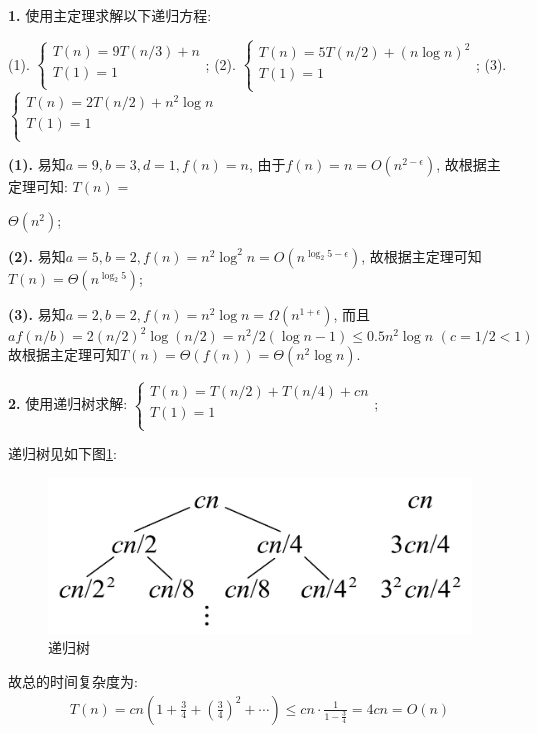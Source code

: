 \documentclass{article}
\begin{document}
\begin{homeworkProblem}
	\textbf{1.} 使用主定理求解以下递归方程:

	(1). $\begin{cases}
		T\left( n \right) =9T\left( n/3 \right) +n\\
		T\left( 1 \right) =1\\
	\end{cases}$;  (2). $\begin{cases}
		T\left( n \right) =5T\left( n/2 \right) +\left( n\log n \right) ^2\\
		T\left( 1 \right) =1\\
	\end{cases}$;  (3). $\begin{cases}
		T\left( n \right) =2T\left( n/2 \right) +n^2\log n\\
		T\left( 1 \right) =1\\
	\end{cases}$


	\solution
	

	\textbf{(1).} 易知$a=9,b=3,d=1,f(n)=n$, 由于$f\left( n \right) =n=O\left( n^{2-\epsilon} \right) $, 故根据主定理可知: 
	$T(n)=$
	
	$\Theta(n^2)$;

	\textbf{(2).} 易知$a=5,b=2,f(n)=n^2\log^2n=O(n^{\log_2 5-\epsilon})$, 故根据主定理可知$T(n)=\Theta \left( n^{\log_2 5} \right)$;

	\textbf{(3).} 易知$a=2,b=2,f(n)=n^2\log n=\Omega \left( n^{1+\epsilon} \right)$, 而且$$af\left( n/b \right) =2\left( n/2 \right) ^2\log \left( n/2 \right) =n^2/2\left( \log n-1 \right) \le 0.5n^2\log n\,\,\left( c=1/2<1 \right)$$
	故根据主定理可知$T(n)=\Theta(f(n))=\Theta(n^2\log n)$.

	\textbf{2.} 使用递归树求解: $\begin{cases}
		T\left( n \right) =T\left( n/2 \right) +T\left( n/4 \right) +cn\\
		T\left( 1 \right) =1\\
	\end{cases}$;
	
	\solution

	递归树见如下图\ref{fig:递归树-3}:
	\begin{figure}[H]  %
		\centering
		\includegraphics[width=0.4\linewidth]{images/title/递归树3.pdf}
		\caption{递归树}
		\label{fig:递归树-3}
	\end{figure}
	故总的时间复杂度为:
	\begin{align}
		T\left( n \right) =cn\left( 1+\frac{3}{4}+\left( \frac{3}{4} \right) ^2+\cdots \right) \le cn\cdot \frac{1}{1-\frac{3}{4}}=4cn=O\left( n \right) 
	\end{align}


\end{homeworkProblem}
\end{document}
